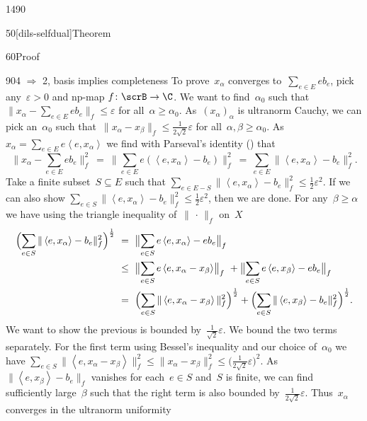 \begin{parsec}{1490}
\begin{point}{50}[dils-selfdual]{Theorem}
\begin{point}{60}{Proof}
\begin{point}{90}{4 $\Rightarrow$ 2, basis implies completeness}
To prove~$x_\alpha$ converges to~$\sum_{e \in E} e b_e$,
    pick any~$\varepsilon > 0$
        and np-map $f\colon \scrB \to \C$.
We want to find~$\alpha_0$
    such that~$\| x_\alpha - \sum_{e \in E} e b_e\|_f \leq \varepsilon$
        for all~$\alpha \geq \alpha_0$.
As~$(x_\alpha)_\alpha$ is ultranorm Cauchy,
we can pick an~$\alpha_0$
such that~$\| x_\alpha - x_\beta \|_f \leq \frac{1}{2\sqrt{2}} \varepsilon$
for all~$\alpha,\beta \geq \alpha_0$.
As~$x_\alpha = \sum_{e \in E} e \left<e,x_\alpha\right>$
we find with Parseval's identity () that
\begin{equation*}
    \bigl\| x_\alpha - \sum_{e \in E} eb_e \bigr\|_f^2
    \ =\  \bigl\| \sum_{e \in E} e(\left<e, x_\alpha\right> - b_e) \bigr\|_f^2
    \ =\  \sum_{e \in E}\| \left<e, x_\alpha\right> - b_e \|_f^2.
\end{equation*}
Take a finite subset~$S \subseteq E$
such that
    $\sum_{e \in E - S}\| \left<e, x_\alpha\right> - b_e \|_f^2 \leq
        \frac{1}{2}\varepsilon^2$.
If we can also show
    $\sum_{e \in  S}\| \left<e, x_\alpha\right> - b_e \|_f^2 \leq
        \frac{1}{2}\varepsilon^2$,
        then we are done.
For any~$\beta \geq \alpha$
    we have using the triangle inequality of~$\|\,\cdot\,\|_f$
        on~$X$
\begin{align*}
    \Bigl(\sum_{e \in S}\| \left<e, x_\alpha\right>
        - b_e \|_f^2\Bigr)^{\frac{1}{2}}
        &\ =\  \bigl\|\sum_{e \in S} e\left<e, x_\alpha\right> - eb_e \bigr\|_f\\
        &\ \leq\  \bigl\|\sum_{e \in S} e\left<e, x_\alpha-x_\beta\right> \bigr\|_f\
        +\bigl\|\sum_{e \in S} e\left<e, x_\beta\right> - eb_e \bigr\|_f\\
        &\ =\  \Bigl( \sum_{e \in S}\|\left<e, x_\alpha-x_\beta\right> \|_f^2 \Bigr)^{\frac{1}{2}}
        +\Bigl(\sum_{e \in S}\| \left<e, x_\beta\right> - b_e \|_f^2
        \Bigr)^{\frac{1}{2}}.
\end{align*}
We want to show the previous is bounded by~$\frac{1}{\sqrt{2}}\varepsilon$.
We bound the two terms separately.
For the first term using Bessel's
inequality and our choice of~$\alpha_0$
we have
$\sum_{e \in S}\|\left<e, x_\alpha-x_\beta\right> \|_f^2 
\leq \|x_\alpha - x_\beta\|^2_f \leq \bigl(\frac{1}{2\sqrt{2}}\varepsilon\bigr)^2.$
As~$\|\left<e,x_\beta\right> - b_e\|_f$
vanishes for each~$e \in S$ and~$S$ is finite,
we can find sufficiently large~$\beta$
such that the right term is also bounded by~$\frac{1}{2\sqrt{2}}\varepsilon$.
Thus~$x_\alpha$ converges in the ultranorm uniformity

\end{point}
\end{point}
\end{point}
\end{parsec}
